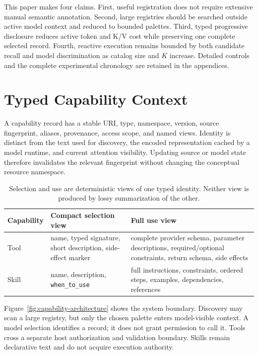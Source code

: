 \documentclass[11pt]{article}
\begin{document}
This paper makes four claims. First, useful registration does not require
extensive manual semantic annotation. Second, large registries should be
searched outside active model context and reduced to bounded palettes. Third,
typed progressive disclosure reduces active token and K/V cost while
preserving one complete selected record. Fourth, reactive execution remains
bounded by both candidate recall and model discrimination as catalog size and
$K$ increase. Detailed controls and the complete experimental chronology are
retained in the appendices.

\section{Typed Capability Context}

A capability record has a stable URI, type, namespace, version, source
fingerprint, aliases, provenance, access scope, and named views. Identity is
distinct from the text used for discovery, the encoded representation cached
by a model runtime, and current attention visibility. Updating source or model
state therefore invalidates the relevant fingerprint without changing the
conceptual resource namespace.

\begin{table}[t]
\centering
\small
\begin{tabularx}{\linewidth}{@{}lXX@{}}
\toprule
Capability & Compact selection view & Full use view \\
\midrule
Tool & name, typed signature, short description, side-effect marker & complete provider schema, parameter descriptions, required/optional constraints, return schema, side effects \\
Skill & name, description, \texttt{when\_to\_use} & full instructions, constraints, ordered steps, examples, dependencies, references \\
\bottomrule
\end{tabularx}
\caption{Selection and use are deterministic views of one typed identity.
Neither view is produced by lossy summarization of the other.}
\label{tab:record-views}
\end{table}

Figure~\ref{fig:capability-architecture} shows the system boundary. Discovery
may scan a large registry, but only the chosen palette enters model-visible
context. A model selection identifies a record; it does not grant permission
to call it. Tools cross a separate host authorization and validation boundary.
Skills remain declarative text and do not acquire execution authority.
\end{document}
